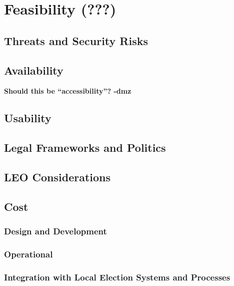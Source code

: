 \chapter{Feasibility (???)}

\section{Threats and Security Risks}
\section{Availability}
\textbf{Should this be ``accessibility''? -dmz}
\section{Usability}
\section{Legal Frameworks and Politics}
\section{LEO Considerations}
\section{Cost}
\subsection{Design and Development}
\subsection{Operational}
\subsection{Integration with Local Election Systems and Processes}